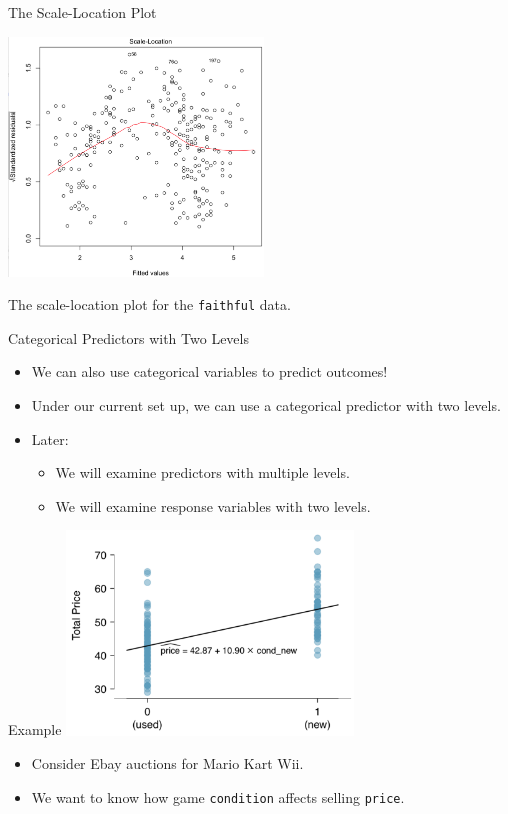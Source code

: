 \begin{frame}{The Scale-Location Plot}
    \vspace{-0.5cm}\begin{center}
        \includegraphics[height=2.5in]{images/scaleloc.png}
    \end{center}
    The scale-location plot for the \texttt{faithful} data.
\end{frame}

\begin{frame}{Categorical Predictors with Two Levels}
    \begin{itemize}
        \item We can also use categorical variables to predict outcomes!
        \item Under our current set up, we can use a categorical predictor with two levels.
        \item Later:
        \begin{itemize}
            \item We will examine predictors with multiple levels.
            \item We will examine response variables with two levels.
        \end{itemize}
    \end{itemize}
\end{frame}

\begin{frame}{Example}
    \hspace{1.5cm}\includegraphics[width=3in]{images/binarypredictor.png}
    \begin{itemize}
        \item Consider Ebay auctions for Mario Kart Wii.
        \item We want to know how game \texttt{condition} affects selling \texttt{price}.
    \end{itemize}
\end{frame}

